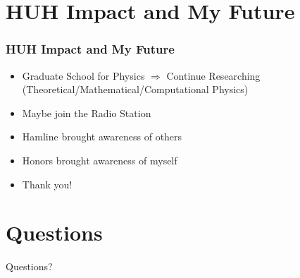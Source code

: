 \documentclass{beamer}
\begin{document}

\section{HUH Impact and My Future}

\begin{frame}
\frametitle{HUH Impact and My Future}
\begin{itemize}
	\item Graduate School for Physics $\Longrightarrow$ Continue Researching (Theoretical/Mathematical/Computational Physics)
	\item Maybe join the Radio Station
	\item Hamline brought awareness of others
	\item Honors brought awareness of myself
	\item Thank you!
\end{itemize}
\end{frame}


\section{Questions}

\begin{frame}
\Huge{\centerline{Questions?}}
\end{frame}

\end{document}
